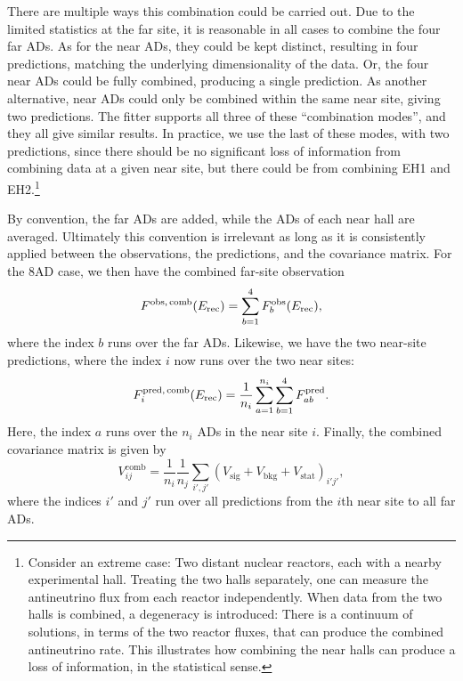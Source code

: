 \documentclass[../thesis.tex]{subfiles}
\begin{document}
There are multiple ways this combination could be carried out. Due to the limited statistics at the far site, it is reasonable in all cases to combine the four far ADs. As for the near ADs, they could be kept distinct, resulting in four predictions, matching the underlying dimensionality of the data. Or, the four near ADs could be fully combined, producing a single prediction. As another alternative, near ADs could only be combined within the same near site, giving two predictions. The fitter supports all three of these ``combination modes'', and they all give similar results. In practice, we use the last of these modes, with two predictions, since there should be no significant loss of information from combining data at a given near site, but there could be from combining EH1 and EH2.\footnote{Consider an extreme case: Two distant nuclear reactors, each with a nearby experimental hall. Treating the two halls separately, one can measure the antineutrino flux from each reactor independently. When data from the two halls is combined, a degeneracy is introduced: There is a continuum of solutions, in terms of the two reactor fluxes, that can produce the combined antineutrino rate. This illustrates how combining the near halls can produce a loss of information, in the statistical sense.}

By convention, the far ADs are added, while the ADs of each near hall are averaged. Ultimately this convention is irrelevant as long as it is consistently applied between the observations, the predictions, and the covariance matrix. For the 8AD case, we then have the combined far-site observation
\begin{equation}
  F^{\mathrm{obs},\,\mathrm{comb}}(E_\mathrm{rec}) = \sum_{b=1}^4 F^{\mathrm{obs}}_b(E_\mathrm{rec}),
\end{equation}
where the index $b$ runs over the far ADs. Likewise, we have the two near-site predictions, where the index $i$ now runs over the two near sites:
\begin{equation}
  F^{\mathrm{pred},\,\mathrm{comb}}_i (E_\mathrm{rec}) = \frac{1}{n_i} \sum_{a=1}^{n_i} \sum_{b=1}^4 F^{\mathrm{pred}}_{ab}.
\end{equation}
Here, the index $a$ runs over the $n_i$ ADs in the near site $i$. Finally, the combined covariance matrix is given by
\begin{equation}
  V^{\mathrm{comb}}_{ij} = \frac{1}{n_i} \frac{1}{n_j} \sum_{i',j'} (V_{\mathrm{sig}} + V_{\mathrm{bkg}} + V_{\mathrm{stat}})_{i'j'},
\end{equation}
where the indices $i'$ and $j'$ run over all predictions from the $i$th near site to all far ADs.
\end{document}
